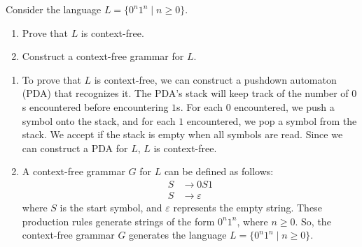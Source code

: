 \documentclass{KNED}
\begin{document}
\begin{exercise}
Consider the language \( L = \{0^n1^n \mid n \geq 0\} \).

\begin{enumerate}
    \item Prove that \( L \) is context-free.
    \item Construct a context-free grammar for \( L \).
\end{enumerate}

\end{exercise}

\begin{solution}

\begin{enumerate}
    \item To prove that \( L \) is context-free, we can construct a pushdown automaton (PDA) that recognizes it. The PDA's stack will keep track of the number of \(0\)s encountered before encountering \(1\)s. For each \(0\) encountered, we push a symbol onto the stack, and for each \(1\) encountered, we pop a symbol from the stack. We accept if the stack is empty when all symbols are read. Since we can construct a PDA for \( L \), \( L \) is context-free.
    
    \item A context-free grammar \( G \) for \( L \) can be defined as follows:
    \begin{align*}
        S &\rightarrow 0S1 \\
        S &\rightarrow \varepsilon
    \end{align*}
    where \( S \) is the start symbol, and \( \varepsilon \) represents the empty string. These production rules generate strings of the form \(0^n1^n\), where \(n \geq 0\). So, the context-free grammar \( G \) generates the language \( L = \{0^n1^n \mid n \geq 0\} \).
\end{enumerate}
\end{solution}
\end{document}
